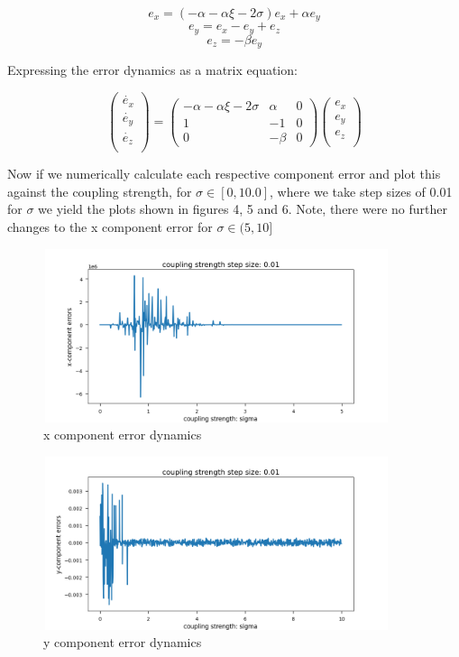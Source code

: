 \documentclass{article}
\begin{document}
$$e_{x} = (-\alpha - \alpha\xi - 2\sigma)e_{x} + \alpha e_{y}$$
$$e_{y} = e_{x} - e_{y} + e_{z}$$
$$e_{z} = -\beta e_{y}$$

Expressing the error dynamics as a matrix equation:


$$
\begin{pmatrix}
    \dot{e_{x}} \\
    \dot{e_{y}} \\
    \dot{e_{z}} \\
\end{pmatrix} =
\begin{pmatrix}
-\alpha - \alpha\xi - 2\sigma & \alpha & 0\\
1 & -1 & 0\\
0 & -\beta & 0
\end{pmatrix}
\begin{pmatrix}
    e_{x} \\
    e_{y} \\
    e_{z} \\
\end{pmatrix}
$$


Now if we numerically calculate each respective component error and plot this against the coupling strength,
for $\sigma \in [0, 10.0]$, where we take step sizes of 0.01 for $\sigma$ we yield the plots shown in figures 4, 5 and 6. Note, there were no further
changes to the x component error for $\sigma \in (5, 10]$

\begin{figure}[H]
\centering
\includegraphics[width = 4in, height = 2in]{x_errors.png}
\caption{x component error dynamics}
\end{figure}

\begin{figure}[H]
\centering
\includegraphics[width = 4in, height = 2in]{y_errors_3.png}
\caption{y component error dynamics}
\end{figure}
\end{document}
